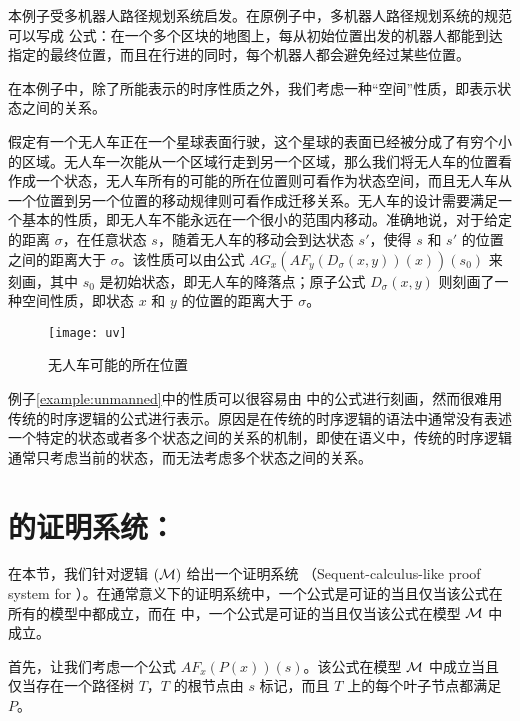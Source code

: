 \begin{example}\label{example:unmanned}
	本例子受多机器人路径规划系统\cite{Craig89,PartoviL14}启发。在原例子中，多机器人路径规划系统的规范可以写成 \CTL{} 公式：在一个多个区块的地图上，每从初始位置出发的机器人都能到达指定的最终位置，而且在行进的同时，每个机器人都会避免经过某些位置。
	
	在本例子中，除了\CTL{}所能表示的时序性质之外，我们考虑一种“空间”性质，即表示状态之间的关系。
	
	假定有一个无人车正在一个星球表面行驶，这个星球的表面已经被分成了有穷个小的区域。无人车一次能从一个区域行走到另一个区域，那么我们将无人车的位置看作成一个状态，无人车所有的可能的所在位置则可看作为状态空间，而且无人车从一个位置到另一个位置的移动规律则可看作成迁移关系。无人车的设计需要满足一个基本的性质，即无人车不能永远在一个很小的范围内移动。准确地说，对于给定的距离 $\sigma$，在任意状态 $s$，随着无人车的移动会到达状态 $s'$，使得 $s$ 和 $s'$ 的位置之间的距离大于 $\sigma$。该性质可以由公式 $AG_x(AF_y(D_\sigma(x,y))(x))(s_0)$ 来刻画，其中 $s_0$ 是初始状态，即无人车的降落点；原子公式 $D_\sigma(x,y)$ 则刻画了一种空间性质，即状态 $x$ 和 $y$ 的位置的距离大于 $\sigma$。
	
	\begin{figure}[h]
		\centering
		\texttt{[image: uv]}
		\caption{无人车可能的所在位置}\label{fig:uv}
	\end{figure}
	
\end{example}

例子\ref{example:unmanned}中的性质可以很容易由 \CTLP{} 中的公式进行刻画，然而很难用传统的时序逻辑的公式进行表示。原因是在传统的时序逻辑的语法中通常没有表述一个特定的状态或者多个状态之间的关系的机制，即使在语义中，传统的时序逻辑通常只考虑当前的状态，而无法考虑多个状态之间的关系。

\section{\CTLP{}的证明系统：\SCTL{}}\label{sec:sctl}
在本节，我们针对逻辑 \CTLP$(\cal M)$ 给出一个证明系统 \sctlm{} （Sequent-calculus-like proof system for \CTLP{}）。在通常意义下的证明系统中，一个公式是可证的当且仅当该公式在所有的模型中都成立，而在 \sctlm{} 中，一个公式是可证的当且仅当该公式在模型 $\cal M$ 中成立。

首先，让我们考虑一个\ctlpm{}公式 $AF_x(P(x))(s)$。该公式在模型 $\cal M$ 中成立当且仅当存在一个路径树 $T$，$T$ 的根节点由 $s$ 标记，而且 $T$ 上的每个叶子节点都满足 $P$。

